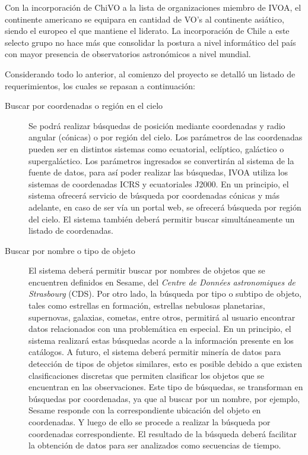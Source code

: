 Con la incorporación de ChiVO a la lista de organizaciones miembro de IVOA, el continente americano se equipara en cantidad de VO's al continente asiático\footnotemark{}, siendo el europeo el que mantiene el liderato. La incorporación de Chile a este selecto grupo no hace más que consolidar la postura a nivel informático del país con mayor presencia de observatorios astronómicos a nivel mundial.


Considerando todo lo anterior, al comienzo del proyecto se detalló un listado de requerimientos, los cuales se repasan a continuación:

\begin{description}
	\item[Buscar por coordenadas o región en el cielo] Se podrá realizar búsquedas de posición mediante coordenadas y radio angular (cónicas) o por	región del cielo. Los parámetros de las coordenadas pueden ser en distintos sistemas como ecuatorial, eclíptico, galáctico o supergaláctico. Los parámetros ingresados se convertirán al sistema de la fuente de datos, para así poder realizar las búsquedas, IVOA utiliza los sistemas de coordenadas ICRS y ecuatoriales J2000. En un principio, el sistema ofrecerá servicio de búsqueda por coordenadas cónicas y más adelante, en caso de ser vía un portal web, se ofrecerá búsqueda por región del cielo. El sistema tambi\'en deberá permitir buscar simultáneamente un listado de coordenadas.
	\item[Buscar por nombre o tipo de objeto] El sistema deberá permitir buscar por nombres de objetos que se encuentren definidos en Sesame, del \emph{Centre de Donn\'ees astronomiques de Strasbourg} (CDS). Por otro lado, la búsqueda por tipo o subtipo de objeto, tales como estrellas en formación, estrellas nebulosas planetarias, supernovas, galaxias, cometas, entre otros, permitirá al usuario encontrar datos relacionados con una problemática en especial. En un principio, el sistema realizará estas búsquedas acorde a la información presente en los catálogos. A futuro, el sistema deberá permitir minería de datos para detección de tipos de objetos similares, esto es posible debido a que existen clasificaciones discretas que permiten clasificar los objetos que se encuentran en las observaciones. Este tipo de búsquedas, se transforman en búsquedas por coordenadas, ya que al buscar por un nombre, por ejemplo, Sesame responde con la correspondiente ubicación del objeto en coordenadas. Y luego de ello se procede a realizar la búsqueda por coordenadas correspondiente. El resultado de la búsqueda deberá facilitar la obtención de datos para ser analizados como secuencias de tiempo.

\end{description}
